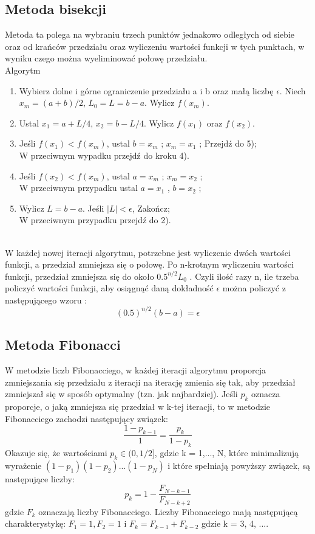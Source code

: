 \documentclass{classrep}
\begin{document}
\subsection{Metoda bisekcji \cite{1}}
Metoda ta polega na wybraniu trzech punktów jednakowo odległych od siebie oraz od krańców przedziału oraz wyliczeniu wartości funkcji w tych punktach, w wyniku czego można wyeliminować połowę przedziału.\\
Algorytm\\
\begin{enumerate}

\item Wybierz dolne i górne ograniczenie przedziału a i b oraz małą liczbę $\epsilon$. Niech $x_m = (a + b)/2$, $L_0 =L=b-a$. Wylicz $f(x_m )$.
\item Ustal $x_1 = a + L/4$, $x_2 = b - L/4$. Wylicz $f(x_1 )$ oraz $f(x_2 )$.
\item Jeśli $f(x_1 ) < f(x_m )$, ustal $b = x_m$ ; $x_m = x_1$ ; Przejdź do 5);\\
 W przeciwnym wypadku przejdź do kroku 4).
\item Jeśli $f(x_2 ) < f(x_m )$, ustal $a = x_m$ ; $x_m = x_2$ ;\\
 W przeciwnym przypadku ustal $a = x_1$ , $b = x_2$ ;
\item Wylicz $L = b - a$. Jeśli $|L| < \epsilon$, Zakończ;\\
 W przeciwnym przypadku przejdź do 2).
\end{enumerate}
 \\

\indent W każdej nowej iteracji algorytmu, potrzebne jest wyliczenie dwóch wartości funkcji, a przedział zmniejsza się o połowę. Po n-krotnym wyliczeniu wartości funkcji, przedział zmniejsza się do około $0.5^{n/2} L_0$ . Czyli ilość razy n, ile trzeba policzyć wartości funkcji, aby osiągnąć daną dokładność $\epsilon$ można policzyć z następującego wzoru : 
$$(0.5)^{n/2} (b - a) = \epsilon$$


\subsection{Metoda Fibonacci \cite{1}}
W metodzie liczb Fibonacciego, w każdej iteracji algorytmu proporcja zmniejszania się przedziału z iteracji na iterację zmienia się tak, aby przedział zmniejszał się w sposób optymalny (tzn. jak najbardziej). Jeśli $p_k$ oznacza proporcje, o jaką zmniejsza się przedział w k-tej iteracji, to w metodzie Fibonacciego zachodzi następujący związek:\\
$$\frac{1-p_{k-1}}{1} = \frac{p_k}{1-p_k}$$
Okazuje się, że wartościami $p_k \in (0, 1/2]$, gdzie k = 1,..., N, które minimalizują wyrażenie $(1-p_1)(1-p_2)...(1-p_N)$ i które spełniają powyższy związek, są następujące liczby:
$$p_k=1-\frac{F_{N-k-1}}{F_{N-k+2}} $$
gdzie $F_k$ oznaczają liczby Fibonacciego. Liczby Fibonacciego mają następującą charakterystykę: $F_1 = 1, F_2 = 1$ i $F_k = F_{k−1} + F_{k−2}$ gdzie k = 3, 4, ....\\
\end{document}
